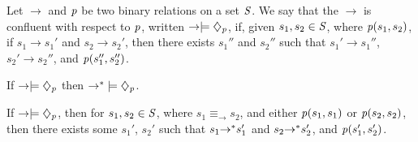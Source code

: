 \documentclass[numbers]{sigplanconf}
\begin{document}
\begin{definition}
  Let $\rightarrow$ and $\mathit{p}$ be two binary relations on a set $\mathit{S}$.
  We say that the $\rightarrow$ is confluent with respect to
  $\mathit{p}$, written
  $\rightarrow\models\diamondsuit_{\mathit{p}}$, if, given $s_1,s_2\in\mathit{S}$,
  where $\mathit{p}(s_1,s_2)$, if $s_1\rightarrow s_1'$ and
  $s_2 \rightarrow s_2'$, then there exists $s_1''$ and $s_2''$ such that
  $s_1'\rightarrow s_1''$, $s_2' \rightarrow s_2''$, and
  $\mathit{p}(s_1'',s_2'')$.
\end{definition}

\begin{theorem}
  If $\rightarrow\models\diamondsuit_{\mathit{p}}$ then
  ${\rightarrow}^*\models\diamondsuit_{\mathit{p}}$.
\end{theorem}

\begin{theorem}
  If $\rightarrow\models\diamondsuit_{\mathit{p}}$,
  then for $s_1,s_2\in\mathit{S}$, where
  $s_1\equiv_{\rightarrow}s_2$, and either $\mathit{p}(s_1,s_1)$ or
  $\mathit{p}(s_2,s_2)$, then there exists some $s_1'$, $s_2'$ such that $s_1
  {\rightarrow}^* s_1'$ and $s_2 {\rightarrow}^* s_2'$, and
  $\mathit{p}(s_1',s_2')$.
\end{theorem}
\end{document}
